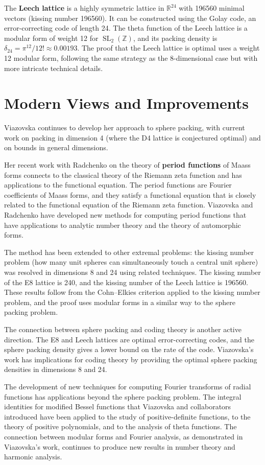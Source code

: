 The \textbf{Leech lattice} is a highly symmetric lattice in $\mathbb{R}^{24}$ with 196560 minimal vectors (kissing number 196560). It can be constructed using the Golay code, an error-correcting code of length 24. The theta function of the Leech lattice is a modular form of weight 12 for $\operatorname{SL}_2(\mathbb{Z})$, and its packing density is $\delta_{24} = \pi^{12}/12! \approx 0.00193$. The proof that the Leech lattice is optimal uses a weight 12 modular form, following the same strategy as the 8-dimensional case but with more intricate technical details.

\section{Modern Views and Improvements}

Viazovska continues to develop her approach to sphere packing, with current work on packing in dimension 4 (where the D4 lattice is conjectured optimal) and on bounds in general dimensions.

Her recent work with Radchenko on the theory of \textbf{period functions} of Maass forms connects to the classical theory of the Riemann zeta function and has applications to the functional equation. The period functions are Fourier coefficients of Maass forms, and they satisfy a functional equation that is closely related to the functional equation of the Riemann zeta function. Viazovska and Radchenko have developed new methods for computing period functions that have applications to analytic number theory and the theory of automorphic forms.

The method has been extended to other extremal problems: the kissing number problem (how many unit spheres can simultaneously touch a central unit sphere) was resolved in dimensions 8 and 24 using related techniques. The kissing number of the E8 lattice is 240, and the kissing number of the Leech lattice is 196560. These results follow from the Cohn--Elkies criterion applied to the kissing number problem, and the proof uses modular forms in a similar way to the sphere packing problem.

The connection between sphere packing and coding theory is another active direction. The E8 and Leech lattices are optimal error-correcting codes, and the sphere packing density gives a lower bound on the rate of the code. Viazovska's work has implications for coding theory by providing the optimal sphere packing densities in dimensions 8 and 24.

The development of new techniques for computing Fourier transforms of radial functions has applications beyond the sphere packing problem. The integral identities for modified Bessel functions that Viazovska and collaborators introduced have been applied to the study of positive-definite functions, to the theory of positive polynomials, and to the analysis of theta functions. The connection between modular forms and Fourier analysis, as demonstrated in Viazovska's work, continues to produce new results in number theory and harmonic analysis.

